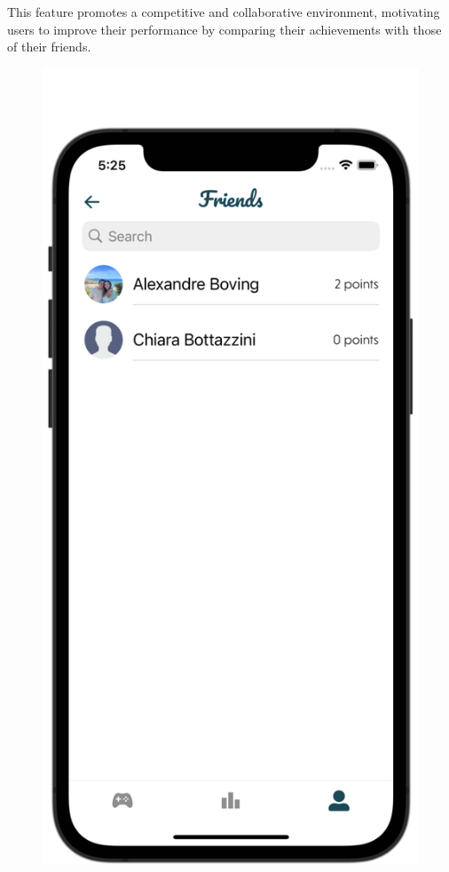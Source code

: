 This feature promotes a competitive and collaborative environment, motivating users to improve their performance by comparing their achievements with those of their friends.



\begin{figure}[H]
    \centering
    \begin{minipage}[b]{0.43\linewidth}
        \centering
        \includegraphics[width=\linewidth]{Mobile UI/Friend List.png}

\end{minipage}
\end{figure}

